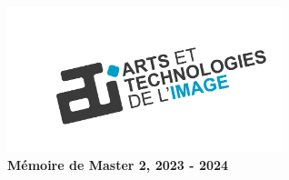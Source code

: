 \begin{titlepage}
\begin{center}
\includegraphics[width=0.60\textwidth]{images/logos/ATI_LogoNoir02.png}~\\[1cm]

{\large \textbf{Mémoire de Master 2, 2023 - 2024}}

\end{center}
\end{titlepage}